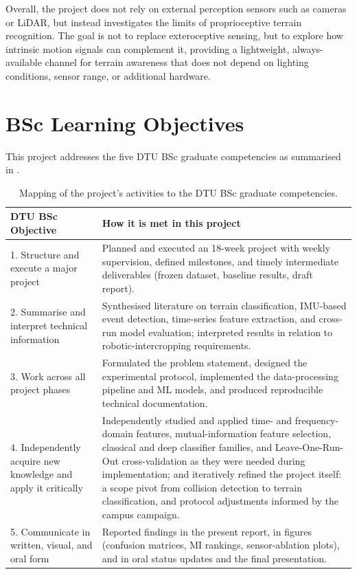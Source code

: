 Overall, the project does not rely on external perception sensors such as cameras or LiDAR, but instead investigates the limits of proprioceptive terrain recognition. The goal is not to replace exteroceptive sensing, but to explore how intrinsic motion signals can complement it, providing a lightweight, always-available channel for terrain awareness that does not depend on lighting conditions, sensor range, or additional hardware.

\newpage
\section{BSc Learning Objectives}

This project addresses the five DTU BSc graduate competencies \cite{DTU_BachelorProjectRules2026} as summarised in .

\begin{table}[H]
\centering
\small
\renewcommand{\arraystretch}{1.25}
\begin{tabular}{p{}p{}}
\toprule
\textbf{DTU BSc Objective} & \textbf{How it is met in this project} \\
\midrule
1. Structure and execute a major project & Planned and executed an 18-week project with weekly supervision, defined milestones, and timely intermediate deliverables (frozen dataset, baseline results, draft report). \\

2. Summarise and interpret technical information & Synthesised literature on terrain classification, IMU-based event detection, time-series feature extraction, and cross-run model evaluation; interpreted results in relation to robotic-intercropping requirements. \\

3. Work across all project phases & Formulated the problem statement, designed the experimental protocol, implemented the data-processing pipeline and ML models, and produced reproducible technical documentation. \\

4. Independently acquire new knowledge and apply it critically & Independently studied and applied time- and frequency-domain features, mutual-information feature selection, classical and deep classifier families, and Leave-One-Run-Out cross-validation as they were needed during implementation; and iteratively refined the project itself: a scope pivot from collision detection to terrain classification, and protocol adjustments informed by the campus campaign. \\

5. Communicate in written, visual, and oral form & Reported findings in the present report, in figures (confusion matrices, MI rankings, sensor-ablation plots), and in oral status updates and the final presentation. \\
\bottomrule
\end{tabular}
\caption{Mapping of the project's activities to the DTU BSc graduate competencies.}
\label{tab:learning_objectives}
\end{table}

